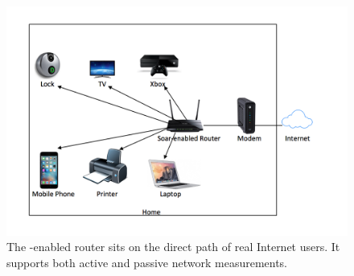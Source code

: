 \begin{figure}%
\centering
\includegraphics[width=0.8\columnwidth]{figure/home-network.png}
\caption{The \sysname-enabled router sits on the direct path of real 
Internet users. It supports both active and passive network measurements.}
\label{figure:design}
\end{figure}

